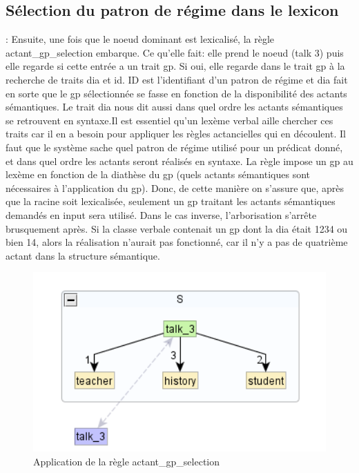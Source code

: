 \subsection{Sélection du patron de régime dans le lexicon}:
Ensuite, une fois que le noeud dominant est lexicalisé, la règle actant\_gp\_selection embarque. Ce qu'elle fait: elle prend le noeud (talk 3) puis elle regarde si cette entrée a un trait gp. Si oui, elle regarde dans le trait gp à la recherche de traits dia et id. ID est l'identifiant d'un patron de régime et dia fait en sorte que le gp sélectionnée se fasse en fonction de la disponibilité des actants sémantiques. Le trait dia nous dit aussi dans quel ordre les actants sémantiques se retrouvent en syntaxe.Il est essentiel qu'un lexème verbal aille chercher ces traits car il en a besoin pour appliquer les règles actancielles qui en découlent. Il faut que le système sache quel patron de régime utilisé pour un prédicat donné, et dans quel ordre les actants seront réalisés en syntaxe. La règle impose un gp au lexème en fonction de la diathèse du gp (quels actants sémantiques sont nécessaires à l'application du gp). Donc, de cette manière on s'assure que, après que la racine soit lexicalisée, seulement un gp traitant les actants sémantiques demandés en input sera utilisé. Dans le cas inverse, l'arborisation s'arrête brusquement après. Si la classe verbale contenait un gp dont la dia était 1234 ou bien 14, alors la réalisation n'aurait pas fonctionné, car il n'y a pas de quatrième actant dans la structure sémantique.

\begin{figure}[htb]
	\centering
	\includegraphics[width=1\textwidth, trim = {0cm 0cm 0cm 0cm},clip]{ch6/figs/selectiongp.png}
	\caption{Application de la règle actant\_gp\_selection}
	\label{deroulement1}
\end{figure}

